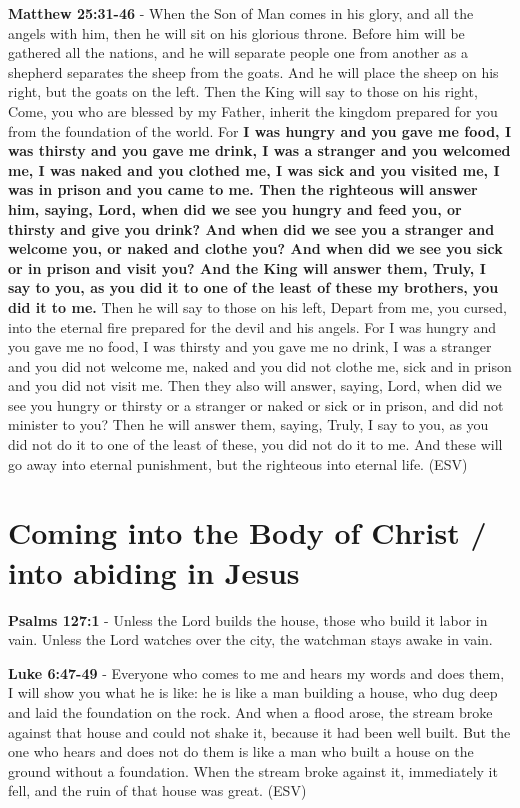 \documentclass[11pt]{article}
\begin{document}
\textbf{Matthew 25:31-46} - When the Son of Man comes in his glory, and all the angels with him, then he will sit on his glorious throne. Before him will be gathered all the nations, and he will separate people one from another as a shepherd separates the sheep from the goats. And he will place the sheep on his right, but the goats on the left. Then the King will say to those on his right, Come, you who are blessed by my Father, inherit the kingdom prepared for you from the foundation of the world. For \textbf{I was hungry and you gave me food, I was thirsty and you gave me drink, I was a stranger and you welcomed me, I was naked and you clothed me, I was sick and you visited me, I was in prison and you came to me. Then the righteous will answer him, saying, Lord, when did we see you hungry and feed you, or thirsty and give you drink? And when did we see you a stranger and welcome you, or naked and clothe you? And when did we see you sick or in prison and visit you? And the King will answer them, Truly, I say to you, as you did it to one of the least of these my brothers, you did it to me.} Then he will say to those on his left, Depart from me, you cursed, into the eternal fire prepared for the devil and his angels. For I was hungry and you gave me no food, I was thirsty and you gave me no drink, I was a stranger and you did not welcome me, naked and you did not clothe me, sick and in prison and you did not visit me. Then they also will answer, saying, Lord, when did we see you hungry or thirsty or a stranger or naked or sick or in prison, and did not minister to you? Then he will answer them, saying, Truly, I say to you, as you did not do it to one of the least of these, you did not do it to me. And these will go away into eternal punishment, but the righteous into eternal life. (ESV)

\section{Coming into the Body of Christ / into abiding in Jesus}
\label{sec:org4af5756}
\textbf{Psalms 127:1} - Unless the Lord builds the house, those who build it labor in vain. Unless the Lord watches over the city, the watchman stays awake in vain.

\textbf{Luke 6:47-49} - Everyone who comes to me and hears my words and does them, I will show you what he is like: he is like a man building a house, who dug deep and laid the foundation on the rock. And when a flood arose, the stream broke against that house and could not shake it, because it had been well built. But the one who hears and does not do them is like a man who built a house on the ground without a foundation. When the stream broke against it, immediately it fell, and the ruin of that house was great. (ESV)
\end{document}
